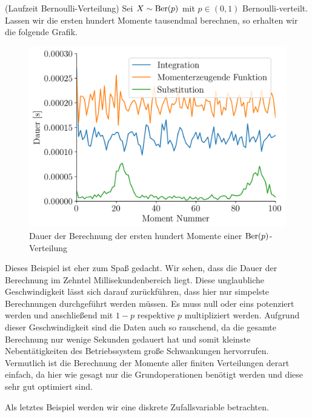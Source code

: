 \begin{Beispiel}{(Laufzeit Bernoulli-Verteilung)}
Sei $X \sim \operatorname{Ber}(p)$ mit $p \in (0, 1)$ Bernoulli-verteilt. Lassen wir die ersten hundert Momente tausendmal berechnen, so erhalten wir die folgende Grafik.

\begin{figure}[H]
\centering
\includegraphics[width=0.5\linewidth]{./Section/Momente/Dauer Ber.png}
\vspace*{-.3\baselineskip}
\caption{Dauer der Berechnung der ersten hundert Momente einer $\operatorname{Ber}(p)$-Verteilung}
\end{figure}

Dieses Beispiel ist eher zum Spaß gedacht. Wir sehen, dass die Dauer der Berechnung im Zehntel Millisekundenbereich liegt. Diese unglaubliche Geschwindigkeit lässt sich darauf zurückführen, dass hier nur simpelste Berechnungen durchgeführt werden müssen. Es muss null oder eins potenziert werden und anschließend mit $1 - p$ respektive $p$ multipliziert werden. Aufgrund dieser Geschwindigkeit sind die Daten auch so rauschend, da die gesamte Berechnung nur wenige Sekunden gedauert hat und somit kleinste Nebentätigkeiten des Betriebssystem große Schwankungen hervorrufen. Vermutlich ist die Berechnung der Momente aller finiten Verteilungen derart \glqq einfach\grqq{}, da hier wie gesagt nur die Grundoperationen benötigt werden und diese sehr gut optimiert sind.
\end{Beispiel}

Als letztes Beispiel werden wir eine diskrete Zufallsvariable betrachten.

